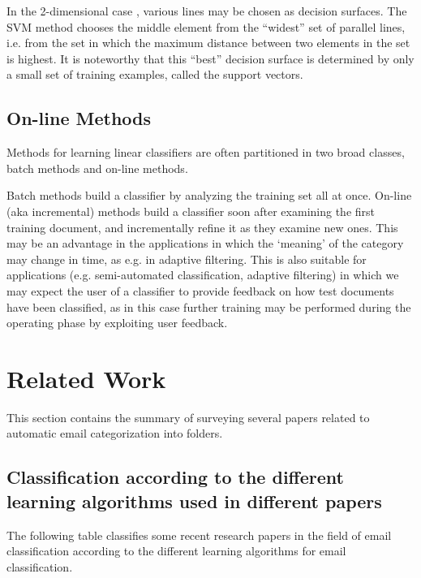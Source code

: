In the 2-dimensional case , various lines may be chosen as decision surfaces. 
The SVM method chooses the middle element from the ``widest'' set of parallel 
lines, i.e. from the set in which the maximum distance between two elements in 
the set is highest. It is noteworthy that this ``best'' decision surface is 
determined by only a small set of training examples, called the support vectors.

\subsection{On-line Methods}
Methods for learning linear classifiers are often partitioned in two broad 
classes, batch methods and on-line methods.

Batch methods build a classifier by analyzing the training set all at once. 
On-line (aka incremental) methods build a classifier soon after examining 
the first training document, and incrementally refine it as they examine new ones. 
This may be an advantage in the applications in which the `meaning' of the 
category may change in time, as e.g. in adaptive filtering. This is also suitable 
for applications (e.g. semi-automated classification, adaptive filtering) in 
which we may expect the user of a classifier to provide feedback on how test 
documents have been classified, as in this case further training may be performed 
during the operating phase by exploiting user feedback.

\newpage
\section{Related Work}
This section contains the summary of surveying several papers related to automatic email categorization into folders.

\label{sec:related_work}

\subsection{Classification according to the different learning algorithms used in different papers}
The following table classifies some recent research papers in the field of email 
classification according to the different learning algorithms for email classification.

